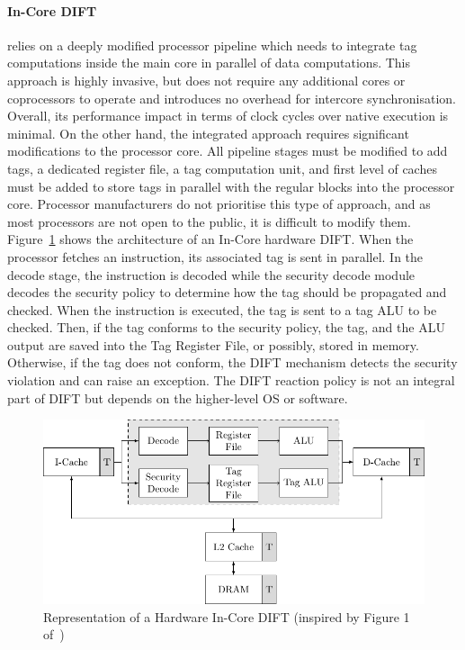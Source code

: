 \paragraph{In-Core DIFT} relies on a deeply modified processor pipeline which needs to integrate tag computations inside the main core in parallel of data computations. This approach is highly invasive, but does not require any additional cores or coprocessors to operate and introduces no overhead for intercore synchronisation. Overall, its performance impact in terms of clock cycles over native execution is minimal. On the other hand, the integrated approach requires significant modifications to the processor core. All pipeline stages must be modified to add tags, a dedicated register file, a tag computation unit, and first level of caches must be added to store tags in parallel with the regular blocks into the processor core. Processor manufacturers do not prioritise this type of approach, and as most processors are not open to the public, it is difficult to modify them. Figure~\ref{fig:incore_dift} shows the architecture of an In-Core hardware DIFT. When the processor fetches an instruction, its associated tag is sent in parallel. In the decode stage, the instruction is decoded while the security decode module decodes the security policy to determine how the tag should be propagated and checked. When the instruction is executed, the tag is sent to a tag ALU to be checked. Then, if the tag conforms to the security policy, the tag, and the ALU output are saved into the Tag Register File, or possibly, stored in memory. Otherwise, if the tag does not conform, the DIFT mechanism detects the security violation and can raise an exception. The DIFT reaction policy is not an integral part of DIFT but depends on the higher-level OS or software.

\begin{figure}[ht]
    \centering
    \includegraphics{c2_soa/img/incore.pdf}
    \caption{Representation of a Hardware In-Core DIFT (inspired by Figure 1 of~\cite{KDK-09-dsn})}
    \label{fig:incore_dift}
\end{figure}

